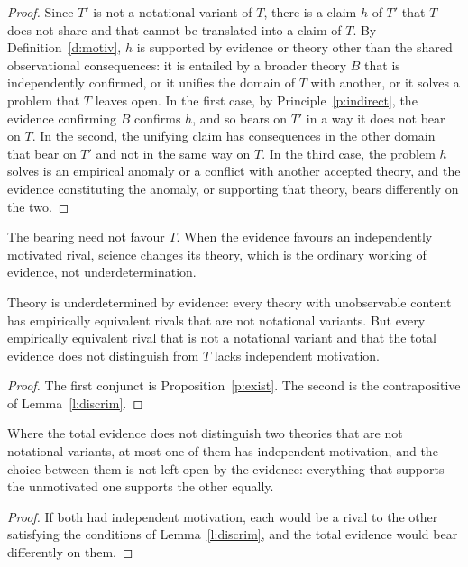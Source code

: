 \documentclass{situationist-preprint}
\begin{document}
\begin{proof}
Since $T'$ is not a notational variant of $T$, there is a claim $h$ of $T'$ that $T$ does not share and that cannot be translated into a claim of $T$. By Definition~\ref{d:motiv}, $h$ is supported by evidence or theory other than the shared observational consequences: it is entailed by a broader theory $B$ that is independently confirmed, or it unifies the domain of $T$ with another, or it solves a problem that $T$ leaves open. In the first case, by Principle~\ref{p:indirect}, the evidence confirming $B$ confirms $h$, and so bears on $T'$ in a way it does not bear on $T$. In the second, the unifying claim has consequences in the other domain that bear on $T'$ and not in the same way on $T$. In the third case, the problem $h$ solves is an empirical anomaly or a conflict with another accepted theory, and the evidence constituting the anomaly, or supporting that theory, bears differently on the two.
\end{proof}

The bearing need not favour $T$. When the evidence favours an independently motivated rival, science changes its theory, which is the ordinary working of evidence, not underdetermination.

\begin{theorem}\label{t:main}
Theory is underdetermined by evidence: every theory with unobservable content has empirically equivalent rivals that are not notational variants. But every empirically equivalent rival that is not a notational variant and that the total evidence does not distinguish from $T$ lacks independent motivation.
\end{theorem}

\begin{proof}
The first conjunct is Proposition~\ref{p:exist}. The second is the contrapositive of Lemma~\ref{l:discrim}.
\end{proof}

\begin{corollary}\label{c:choice}
Where the total evidence does not distinguish two theories that are not notational variants, at most one of them has independent motivation, and the choice between them is not left open by the evidence: everything that supports the unmotivated one supports the other equally.
\end{corollary}

\begin{proof}
If both had independent motivation, each would be a rival to the other satisfying the conditions of Lemma~\ref{l:discrim}, and the total evidence would bear differently on them.
\end{proof}
\end{document}
